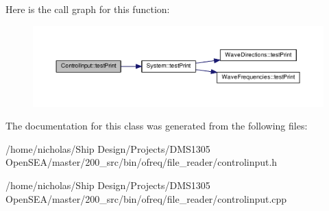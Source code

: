 Here is the call graph for this function\-:\nopagebreak
\begin{figure}[H]
\begin{center}
\leavevmode
\includegraphics[width=350pt]{class_control_input_a2f95d64805ed477f78bf778bb786b30b_cgraph}
\end{center}
\end{figure}




The documentation for this class was generated from the following files\-:\begin{DoxyCompactItemize}
\item 
/home/nicholas/\-Ship Design/\-Projects/\-D\-M\-S1305 Open\-S\-E\-A/master/200\-\_\-src/bin/ofreq/file\-\_\-reader/controlinput.\-h\item 
/home/nicholas/\-Ship Design/\-Projects/\-D\-M\-S1305 Open\-S\-E\-A/master/200\-\_\-src/bin/ofreq/file\-\_\-reader/controlinput.\-cpp\end{DoxyCompactItemize}
